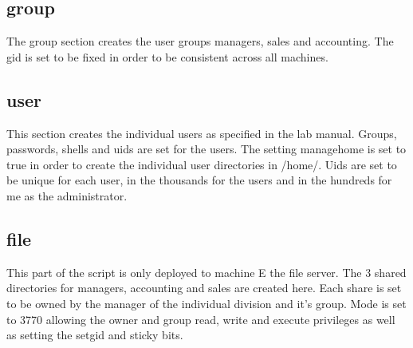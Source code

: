 \documentclass[11pt,onside]{article}
\begin{document}
\subsection{group}
The group section creates the user groups managers, sales and accounting. The gid is set to be fixed in order to be consistent across all machines. 
\subsection{user}
This section creates the individual users as specified in the lab manual. Groups, passwords, shells and uids are set for the users. The setting managehome is set to true in order to create the individual user directories in /home/. Uids are set to be unique for each user, in the thousands for the users and in the hundreds for me as the administrator.
\subsection{file}
This part of the script is only deployed to machine E the file server. The 3 shared directories for managers, accounting and sales are created here. Each share is set to be owned by the manager of the individual division and it's group. Mode is set to 3770 allowing the owner and group read, write and execute privileges as well as setting the setgid and sticky bits.
\end{document}
